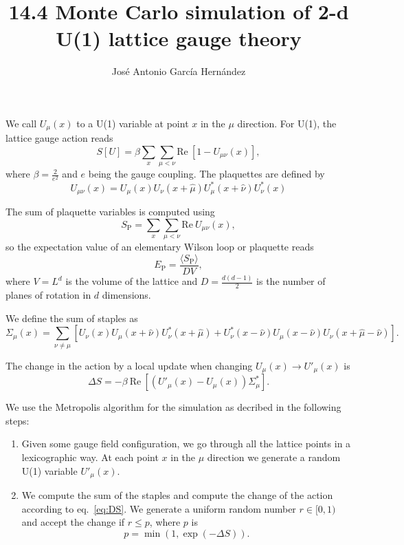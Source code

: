 \documentclass[12pt,a4paper]{article}
\author{José Antonio García Hernández}
\title{14.4 Monte Carlo simulation of 2-d U(1) lattice gauge theory}
\begin{document}
\maketitle

We call $U_{\mu}(x)$ to a U(1) variable at point $x$ in the $\mu$ direction. For U(1), the lattice gauge action reads
\begin{equation}
	\label{eq:wilson_action}
	S[U] = \beta\sum_x \sum_{\mu < \nu} \text{Re}\  \left[1 - U_{\mu\nu}(x) \right],
\end{equation}
where $\beta = \frac{2}{e^2}$ and $e$ being the gauge coupling. The plaquettes are defined by
\begin{equation}
	\label{eq:plaquette}
	U_{\mu\nu}(x) = U_{\mu}(x)U_{\nu}(x+\hat{\mu})U_{\mu}^{*}(x+\hat{\nu})U_{\nu}^{*}(x) 
\end{equation}

The sum of plaquette variables is computed using 
\begin{equation}
	\label{eq:Sp}
	S_{\text{P}} =  \sum_x\sum_{\mu < \nu} \text{Re}\ U_{\mu\nu}(x),
\end{equation}
so the expectation value of an elementary Wilson loop or plaquette reads
\begin{equation}
	\label{eq:Ep}
	E_{\text{P}} =\frac{ \langle S_{\text{P}} \rangle}{D V},
\end{equation}
where $V=L^d$ is the volume of the lattice and $D = \frac{d(d-1)}{2}$ is the number of planes of rotation in $d$ dimensions.

We define the sum of staples as
\begin{equation}
	\label{eq:staples}
	\Sigma_{\mu}(x) = \sum_{\nu \neq \mu} \left[ U_{\nu}(x)U_{\mu}(x+\hat{\nu})U_{\nu}^{*}(x+\hat{\mu}) + U_{\nu}^{*}(x-\hat{\nu})U_{\mu}(x-\hat{\nu})U_{\nu}(x+\hat{\mu}-\hat{\nu})\right] .
\end{equation}


The change in the action  by a local update when changing $U_{\mu}(x) \to U'_{\mu}(x)$ is
\begin{equation}
	\label{eq:DS}
	\Delta S = -\beta \ \text{Re}\ \left[ \left( U'_{\mu}(x) - U_{\mu}(x) \right)\Sigma_{\mu}^{*}\right].
\end{equation}

We use the Metropolis algorithm for the simulation as decribed in the following steps:
\begin{enumerate}
	\item Given some gauge field configuration, we go through all the lattice points in a lexicographic way. At each point $x$ in the $\mu$ direction we generate a random U(1) variable $U'_{\mu}(x)$.
	
	\item We compute the sum of the staples and compute the change of the action according to eq.\ \eqref{eq:DS}. We generate a uniform random number $r\in [0,1)$ and accept the change if $r \leq p$, where $p$ is
	\begin{equation}
		p = \min (1, \exp(-\Delta S)).
\end{equation}	 
\end{enumerate}
\end{document}
